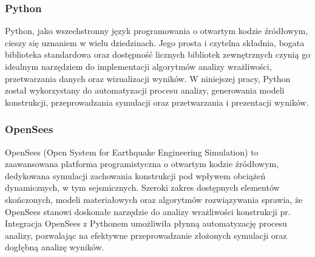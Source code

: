 \subsubsection{Python}

Python, jako wszechstronny język programowania o otwartym kodzie źródłowym, cieszy się uznaniem w wielu dziedzinach\cite{python}.
Jego prosta i czytelna składnia, bogata biblioteka standardowa oraz dostępność licznych bibliotek zewnętrznych czynią go idealnym narzędziem do implementacji algorytmów analizy wrażliwości, przetwarzania danych oraz wizualizacji wyników.
W niniejszej pracy, Python został wykorzystany do automatyzacji procesu analizy, generowania modeli konstrukcji, przeprowadzania symulacji oraz przetwarzania i prezentacji wyników.

\subsubsection{OpenSees}

OpenSees (Open System for Earthquake Engineering Simulation) to zaawansowana platforma programistyczna o otwartym kodzie źródłowym, dedykowana symulacji zachowania konstrukcji pod wpływem obciążeń dynamicznych, w tym sejsmicznych\cite{opensees}.
Szeroki zakres dostępnych elementów skończonych, modeli materiałowych oraz algorytmów rozwiązywania sprawia, że OpenSees stanowi doskonałe narzędzie do analizy wrażliwości konstrukcji pr.
Integracja OpenSees z Pythonem umożliwiła płynną automatyzację procesu analizy, pozwalając na efektywne przeprowadzanie złożonych symulacji oraz dogłębną analizę wyników.